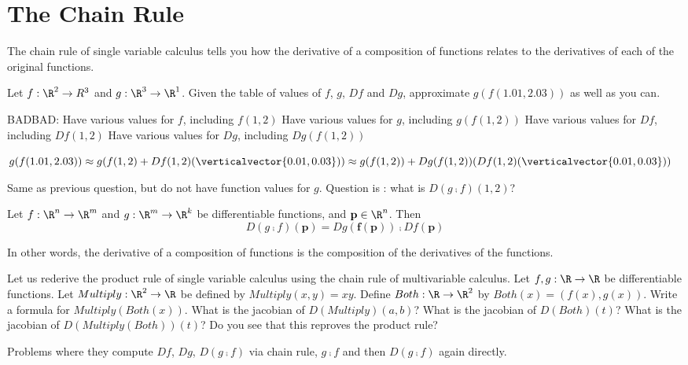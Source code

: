 
\section{The Chain Rule}

The chain rule of single variable calculus tells you how the derivative of a composition of functions relates to the derivatives of each of the original functions.

\begin{question}
	Let $f:\R^2 \to R^3$ and $g:\R^3 \to \R^1$.  Given the table of values of $f$, $g$, $Df$ and $Dg$, approximate $g(f(1.01,2.03))$ as well as you can.
	
	BADBAD: 
	Have various values for $f$, including $f(1,2)$
	Have various values for $g$, including $g(f(1,2))$
	Have various values for $Df$, including $Df(1,2)$
	Have various values for $Dg$, including $Dg(f(1,2))$
	\begin{answer}
		$g(f(1.01,2.03)) \approx g(f(1,2)+ Df(1,2)(\verticalvector{0.01,0.03}))
								 \approx g(f(1,2))+ Dg(f(1,2))(Df(1,2)(\verticalvector{0.01,0.03}))$
	\end{answer}
\end{question}

\begin{question}
	Same as previous question, but do not have function values for $g$.  Question is :  what is $D(g \comp f)(1,2)$?
\end{question}

\begin{theorem}
	Let $f:\R^n \to \R^m$ and $g: \R^m \to \R^k$ be differentiable functions, and $\mathbf{p} \in \R^n$.  Then 
	\[
		D(g \comp f)(\mathbf{p}) = Dg(\mathbf{f(p)}) \comp Df(\mathbf{p})
	\]
	
	In other words, the derivative of a composition of functions is the composition of the derivatives of the functions.
\end{theorem}

\begin{question}
	Let us rederive the product rule of single variable calculus using the chain rule of multivariable calculus.
	Let $f,g:\R \to \R$ be differentiable functions.  Let $Multiply:\R^2 \to \R$ be defined by $Multiply(x,y) = xy$.  
	Define $Both:\R \to \R^2$  by $Both(x) = (f(x),g(x))$. 
	Write a formula for $Multiply(Both(x))$.
	What is the jacobian of $D(Multiply)(a,b)$?
	What is the jacobian of $D(Both)(t)$?
	What is the jacobian of $D(Multiply(Both))(t)$?
	Do you see that this reproves the product rule?
\end{question}

\begin{question}
	Problems where they compute $Df$, $Dg$,  $D(g \comp f)$ via chain rule, $g \comp f$ and then $D(g \comp f)$ again directly.
\end{question}



